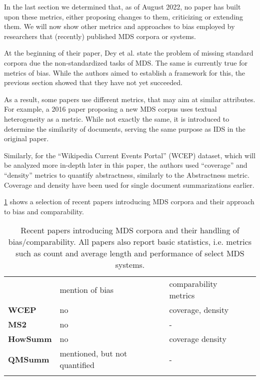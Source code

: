 \documentclass[../main.tex]{subfiles}
\begin{document}
In the last section we determined that, as of August 2022, no paper has built upon these metrics, either proposing changes to them, criticizing or extending them.
We will now show other metrics and approaches to bias employed by researchers that (recently) published MDS corpora or systems.

At the beginning of their paper, Dey et al. state the problem of missing standard corpora due the non-standardized tasks of MDS.
The same is currently true for metrics of bias.
While the authors aimed to establish a framework for this, the previous section showed that they have not yet succeeded.

As a result, some papers use different metrics, that may aim at similar attributes.
For example, a 2016 paper proposing a new MDS corpus uses textual heterogeneity as a metric. \cite{zopf_maxime_peyrard_eckle-kohler_2016}
While not exactly the same, it is introduced to determine the similarity of documents, serving the same purpose as IDS in the original paper.

Similarly, for the \enquote{Wikipedia Current Events Portal} (WCEP) dataset,
which will be analyzed more in-depth later in this paper, the authors used \enquote{coverage} and \enquote{density} metrics to quantify abstractness,
similarly to the Abstractness metric.\cite{WCEP-gholipour-ghalandari-etal-2020-large}
Coverage and density have been used for single document summarizations earlier.\cite{grusky-etal-2018-newsroom}


\ref{tab:status-quo} shows a selection of recent papers introducing MDS corpora and their approach to bias and comparability.

\begin{table}
    \centering
    \begin{tabular}{l|lll}
                                                                                 & mention of bias               & comparability metrics & \\
        \cline{1-3}
        \textbf{WCEP}\cite{WCEP-gholipour-ghalandari-etal-2020-large}            & no                            & coverage, density     & \\
        \textbf{MS2}\cite{MS2-https://doi.org/10.48550/arxiv.2104.06486}         & no                            & -                     & \\
        \textbf{HowSumm}\cite{wikihow-https://doi.org/10.48550/arxiv.2110.03179} & no                            & coverage  density     & \\
        \textbf{QMSumm}\cite{qmsum-https://doi.org/10.48550/arxiv.2104.05938}    & mentioned, but not quantified & -                     & \\
        \multicolumn{1}{l}{}                                                     &                               &                       &
    \end{tabular}

    \caption{Recent papers introducing MDS corpora and their handling of bias/comparability. All papers also report basic statistics, i.e. metrics such as count and average length and performance of select MDS systems.}
    \label{tab:status-quo}
\end{table}
\end{document}
